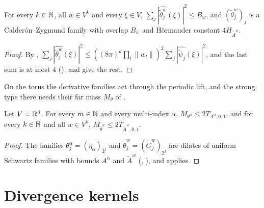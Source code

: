 \begin{theorem}
\label{thm:cz-family-dual-derivative}
\leanok
{}
For every $k \in \mathbb{N}$, all $w \in V^k$ and every $\xi \in V$,
$\sum_j |\widehat{\tilde\theta^w_j}(\xi)|^2 \leq B_w$, and $(\tilde\theta^w_j)_j$ is a
Calder\'on--Zygmund family with overlap $B_w$ and H\"ormander constant $4 H_{\tilde A^w}$.
\end{theorem}

\begin{proof}
\leanok
By ,
$\sum_j |\widehat{\tilde\theta^w_j}(\xi)|^2 \leq ((8\pi)^k \prod_l \|w_l\|)^2
\sum_j |\widehat{\tilde\psi_j}(\xi)|^2$, and the last sum is at most $4$
().  and
 give the rest.
\end{proof}

On the torus the derivative families act through the periodic lift, and the strong type there
needs their far mass $M_\theta$ of .

\begin{lemma}
\label{lem:torus-far-mass-derivative-families}
\leanok
{}
Let $V = \mathbb{R}^d$. For every $m \in \mathbb{N}$ and every multi-index $\alpha$,
$M_{\theta^\alpha} \leq 2 T_{A^\alpha,0,1}$, and for every $k \in \mathbb{N}$ and all $w \in V^k$,
$M_{\tilde\theta^w} \leq 2 T_{\tilde A^w,0,1}$.
\end{lemma}

\begin{proof}
\leanok
The families $\theta^\alpha_j = (\eta_\alpha)_{2^j}$ and $\tilde\theta^w_j = (\tilde G^w_j)_{2^j}$
are dilates of uniform Schwartz families with bounds $A^\alpha$ and $\tilde A^w$
(, ), and
 applies.
\end{proof}

\section{Divergence kernels}
\label{sec:divergence-kernels}

